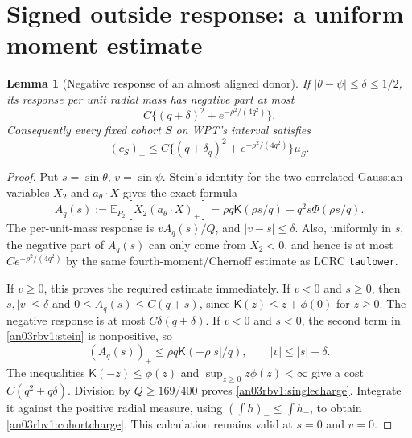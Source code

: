 \documentclass[11pt]{article}
\numberwithin{equation}{section}
\newtheorem{lemma}[theorem]{Lemma}
\theoremstyle{remark}\newtheorem{remark}[theorem]{Remark}
\newcommand{\E}{\mathbb E}
\newcommand{\Kfun}{\mathsf K}
\begin{document}
\section{Signed outside response: a uniform moment estimate}
\begin{lemma}[Negative response of an almost aligned donor]
\label{an03rbv1:donorsign}
If $|\theta-\psi|\le\delta\le1/2$, its response per unit
radial mass has negative part at most
\begin{equation}
 C\{(q+\delta)^2+e^{-\rho^2/(4q^2)}\}.
 \label{an03rbv1:singlecharge}
\end{equation}
Consequently every fixed cohort $S$ on WPT's interval satisfies
\begin{equation}
 (c_S)_-\le C\{(q+\delta_q)^2+e^{-\rho^2/(4q^2)}\}\mu_S.
 \label{an03rbv1:cohortcharge}
\end{equation}
\end{lemma}
\begin{proof}
Put $s=\sin\theta$, $v=\sin\psi$. Stein's identity for the
two correlated Gaussian variables $X_2$ and $a_\theta\cdot X$
gives the exact formula
\begin{equation}
 A_q(s):=\E_{P_2}[X_2(a_\theta\cdot X)_+]
    =\rho q\Kfun(\rho s/q)+q^2s\Phi(\rho s/q).
 \label{an03rbv1:stein}
\end{equation}
The per-unit-mass response is $vA_q(s)/Q$, and $|v-s|\le\delta$.
Also, uniformly in $s$, the negative part of $A_q(s)$ can only
come from $X_2<0$, and hence is at most
$C e^{-\rho^2/(4q^2)}$ by the same fourth-moment/Chernoff
estimate as LCRC \texttt{taulower}.

If $v\ge0$, this proves the required estimate immediately.
If $v<0$ and $s\ge0$, then $s,|v|\le\delta$ and
$0\le A_q(s)\le C(q+s)$, since
$\Kfun(z)\le z+\phi(0)$ for $z\ge0$.
The negative response is at most $C\delta(q+\delta)$.
If $v<0$ and $s<0$, the second term in \eqref{an03rbv1:stein}
is nonpositive, so
\[
 (A_q(s))_+\le\rho q\Kfun(-\rho|s|/q),\qquad
 |v|\le|s|+\delta.
\]
The inequalities $\Kfun(-z)\le\phi(z)$ and
$\sup_{z\ge0}z\phi(z)<\infty$ give a cost
$C(q^2+q\delta)$. Division by $Q\ge169/400$ proves
\eqref{an03rbv1:singlecharge}. Integrate it against the positive
radial measure, using $(\int h)_-\le\int h_-$, to obtain
\eqref{an03rbv1:cohortcharge}.
This calculation remains valid at $s=0$ and $v=0$.
\end{proof}
\end{document}
